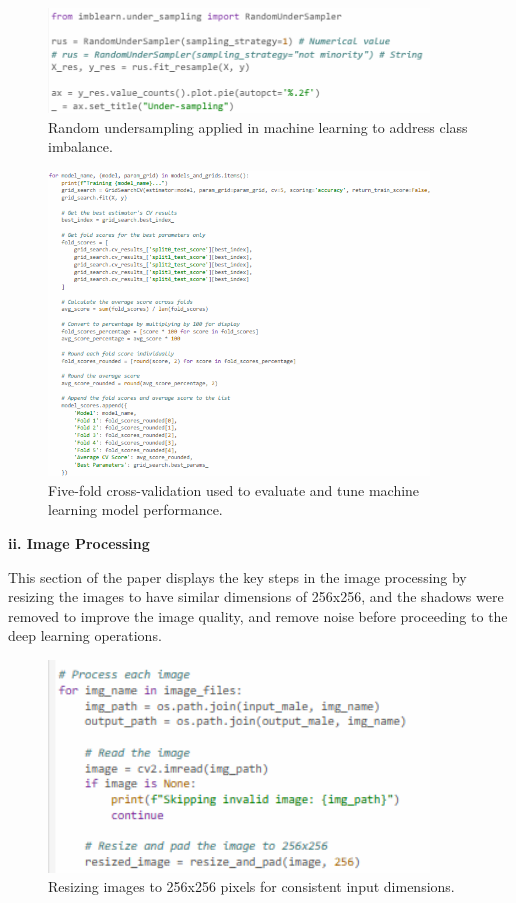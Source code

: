 \begin{figure}[!htbp]
	\centering
	\includegraphics[width=0.9\textwidth, angle=0]{figures/random_undersampling_ML.png}
	\caption{Random undersampling applied in machine learning to address class imbalance.}
\end{figure}

\begin{figure}[!htbp]
	\centering
	\includegraphics[width=0.9\textwidth, angle=0]{figures/ml_five fold_cv.png}
	\caption{Five-fold cross-validation used to evaluate and tune machine learning model performance.}
\end{figure}

\newpage
\noindent\textbf{ii. Image Processing}
\vspace{-0.5cm}

This section of the paper displays the key steps in the image processing by resizing the images to have similar dimensions of 256x256, and the shadows were removed to improve the image quality, and remove noise before proceeding to the deep learning operations.
 
\begin{figure}[!htbp]
	\centering
	\includegraphics[width=0.9\textwidth, angle=0]{figures/same_dimensions.png}
	\caption{Resizing images to 256x256 pixels for consistent input dimensions.}
\end{figure}

